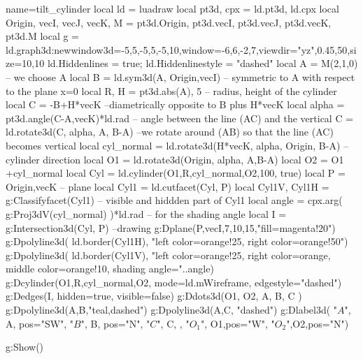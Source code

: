 \documentclass{standalone}
\begin{document}
\begin{luadraw}{name=tilt_cylinder}
local ld = luadraw
local pt3d, cpx = ld.pt3d, ld.cpx
local Origin, vecI, vecJ, vecK, M = pt3d.Origin, pt3d.vecI, pt3d.vecJ, pt3d.vecK, pt3d.M
local g = ld.graph3d:new{window3d={-5,5,-5,5,-5,10},window={-6,6,-2,7},viewdir={"yz",0.45,50},size={10,10}}
ld.Hiddenlines = true; ld.Hiddenlinestyle = "dashed"
local A = M(2,1,0) -- we choose A 
local B = ld.sym3d(A, {Origin,vecI}) -- symmetric to A with respect to the plane x=0
local R, H = pt3d.abs(A), 5 -- radius, height of the cylinder
local C = -B+H*vecK --diametrically opposite to B plus H*vecK
local alpha = pt3d.angle(C-A,vecK)*ld.rad -- angle between the line (AC) and the vertical
C = ld.rotate3d(C, alpha, {A, B-A}) --we rotate around (AB) so that the line (AC) becomes vertical
local cyl_normal = ld.rotate3d(H*vecK, alpha, {Origin, B-A}) -- cylinder direction
local O1 = ld.rotate3d(Origin, alpha, {A,B-A})
local O2 = O1 +cyl_normal
local Cyl = ld.cylinder(O1,R,cyl_normal,O2,100, true)
local P = {Origin,vecK} -- plane
local Cyl1 = ld.cutfacet(Cyl, P)
local Cyl1V, Cyl1H = g:Classifyfacet(Cyl1) -- visible and hiddden part of Cyl1
local angle = cpx.arg( g:Proj3dV(cyl_normal) )*ld.rad -- for the shading angle
local I = g:Intersection3d(Cyl, P)
--drawing
g:Dplane(P,vecI,7,10,15,"fill=magenta!20")
g:Dpolyline3d( ld.border(Cyl1H), "left color=orange!25, right color=orange!50")
g:Dpolyline3d( ld.border(Cyl1V), "left color=orange!25, right color=orange, middle color=orange!10, shading angle="..angle)
g:Dcylinder(O1,R,cyl_normal,O2, {mode=ld.mWireframe, edgestyle="dashed"})
g:Dedges(I, {hidden=true, visible=false})
g:Ddots3d({O1, O2, A, B, C} )
g:Dpolyline3d({A,B},"teal,dashed")
g:Dpolyline3d({A,C}, "dashed")
g:Dlabel3d( "$A$", A, {pos="SW"}, "$B$", B, {pos="N"}, "$C$", C, {}, "$O_1$", 
    O1,{pos="W"}, "$O_2$",O2,{pos="N"})

g:Show()
\end{luadraw}
\end{document}
